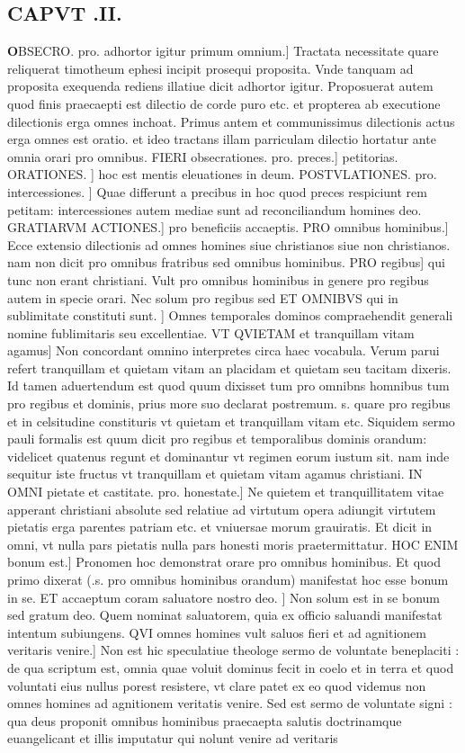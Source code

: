 \documentclass{article}
\begin{document}
\begin{pages}
\section{CAPVT .II.}\pstart \huge\textbf{O}\normalsize BSECRO. pro. adhortor igitur primum omnium.] Tractata necessitate quare reliquerat timotheum ephesi incipit prosequi proposita. Vnde tanquam ad proposita exequenda rediens illatiue dicit adhortor igitur. Proposuerat autem quod finis praecaepti est dilectio de corde puro etc. et propterea ab executione dilectionis erga omnes inchoat. Primus antem et communissimus dilectionis actus erga omnes est oratio. et ideo tractans illam parriculam dilectio hortatur ante omnia orari pro omnibus. FIERI obsecrationes. pro. preces.] petitorias. ORATIONES. ] hoc est mentis eleuationes in deum. POSTVLATIONES. pro. intercessiones. ] Quae differunt a precibus in hoc quod preces respiciunt rem petitam: intercessiones autem mediae sunt ad reconciliandum homines deo. GRATIARVM ACTIONES.] pro beneficiis accaeptis. PRO omnibus hominibus.] Ecce extensio dilectionis ad omnes homines siue christianos siue non christianos. nam non dicit pro omnibus fratribus sed omnibus hominibus. PRO regibus] qui tunc non erant christiani. Vult pro omnibus hominibus in genere pro regibus autem in specie orari. Nec solum pro regibus sed ET OMNIBVS qui in sublimitate constituti sunt. ] Omnes temporales dominos compraehendit generali nomine fublimitaris seu excellentiae. VT QVIETAM et tranquillam vitam agamus] Non concordant omnino interpretes circa haec vocabula. Verum parui refert tranquillam et quietam vitam an placidam et quietam seu tacitam dixeris. Id tamen aduertendum est quod quum dixisset tum pro omnibns homnibus tum pro regibus et dominis, prius more suo declarat postremum. s. quare pro regibus et in celsitudine constituris vt quietam et tranquillam vitam etc. Siquidem sermo pauli formalis est quum dicit pro regibus et temporalibus dominis orandum: videlicet quatenus regunt et dominantur vt regimen eorum iustum sit. nam inde sequitur iste fructus vt tranquillam et quietam vitam agamus christiani. IN OMNI pietate et castitate. pro. honestate.] Ne quietem et tranquillitatem vitae apperant christiani absolute sed relatiue ad virtutum opera adiungit virtutem pietatis erga parentes patriam etc. et vniuersae morum grauiratis. Et dicit in omni, vt nulla pars pietatis nulla pars honesti moris praetermittatur.  \pend\pstart HOC ENIM bonum est.] Pronomen hoc demonstrat orare pro omnibus hominibus. Et quod primo dixerat (.s. pro omnibus hominibus orandum) manifestat hoc esse bonum in se. ET accaeptum coram saluatore nostro deo. ] Non solum est in se bonum sed gratum deo. Quem nominat saluatorem, quia ex officio saluandi manifestat intentum subiungens. QVI omnes homines vult saluos fieri et ad agnitionem veritaris venire.] Non est hic speculatiue theologe sermo de voluntate beneplaciti : de qua scriptum est, omnia quae voluit dominus fecit in coelo et in terra et quod voluntati eius nullus porest resistere, vt clare patet ex eo quod videmus non omnes homines ad agnitionem veritatis venire. Sed est sermo de voluntate signi : qua deus proponit omnibus hominibus praecaepta salutis doctrinamque euangelicant et illis imputatur qui nolunt venire ad veritaris 
\end{pages}
\end{document}

